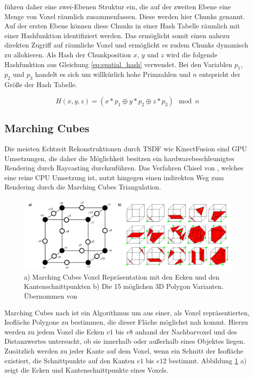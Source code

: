 \citet{niessner2013real} führen daher eine zwei-Ebenen Struktur ein, die auf der zweiten Ebene eine Menge von Voxel räumlich zusammenfassen. Diese werden hier Chunks genannt. Auf der ersten Ebene können diese Chunks in einer Hash Tabelle räumlich mit einer Hashfunktion identifiziert werden. Das ermöglicht somit einen nahezu direkten Zugriff auf räumliche Voxel und ermöglicht es zudem Chunks dynamisch zu allokieren. Als Hash der Chunkposition \(x\), \(y\) und \(z\) wird die folgende Hashfunktion aus Gleichung \ref{eq:spatial_hash} verwendet. Bei den Variablen \(p_1\), \(p_2\) und \(p_3\) handelt es sich um willkürlich hohe Primzahlen und \(n\) entspricht der Größe der Hash Tabelle. 

\begin{equation}\label{eq:spatial_hash}
H(x,y,z) = (x * p_1 \oplus y * p_2 \oplus z * p_3) \mod n
\end{equation}

\subsection{Marching Cubes}

Die meisten Echtzeit Rekonstruktionen durch TSDF wie KinectFusion sind GPU Umsetzungen, die daher die Möglichkeit besitzen ein hardwarebeschleunigtes Rendering durch Raycasting durchzuführen. Das Verfahren Chisel von \citet{Klingensmith_2015_7924}, welches eine reine CPU Umsetzung ist, nutzt hingegen einen indirekten Weg zum Rendering durch die Marching Cubes Triangulation. \\

\begin{figure}[h]
  \centering
	\includegraphics[width=1.0\textwidth]{content/images/methods/marchingcubes.png} 
  \caption{a) Marching Cubes Voxel Repräsentation mit den Ecken und den Kantenschnittpunkten b) Die 15 möglichen 3D Polygon Varianten. Übernommen von \citet{MarchingCubes:online}}
  \label{fig:marchingcubes}
\end{figure}

Marching Cubes nach \citet{lorensen1987marching} ist ein Algorithmus um aus einer, als Voxel repräsentierten, Isofläche Polygone zu bestimmen, die dieser Fläche möglichst nah kommt. Hierzu werden zu jedem Voxel die Ecken \(v1\) bis \(v8\) anhand der Nachbarvoxel und des Distanzwertes untersucht, ob sie innerhalb oder außerhalb eines Objektes liegen. Zusätzlich werden zu jeder Kante auf dem Voxel, wenn ein Schnitt der Isofläche existiert, die Schnittpunkte auf den Kanten \(e1\) bis \(e12\) bestimmt. Abbildung \ref{fig:marchingcubes} a) zeigt die Ecken und Kantenschnittpunkte eines Voxels. \\

